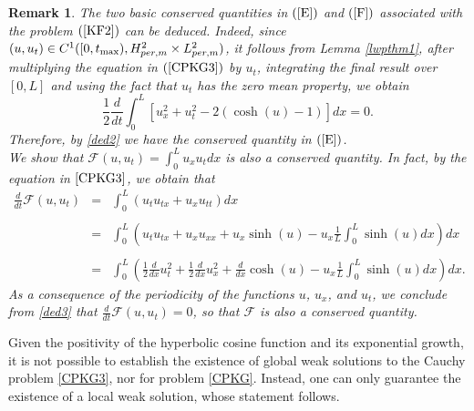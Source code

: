 \documentclass[12pt,reqno,a4paper]{amsart} %
\numberwithin{equation}{section}
\numberwithin{figure}{section}
\newtheorem{remark}[theorem]{Remark}
\begin{document}
\begin{remark}\label{cqEF} 
The two basic conserved quantities in $(\ref{E})$ and $(\ref{F})$ associated with the problem $(\ref{KF2})$ can be deduced. Indeed, since $(u, u_t)\in C^1([0,t_{\rm{max}}),H_{per,m}^2\times L_{per,m}^2)$, it follows from Lemma \ref{lwpthm1}, after multiplying the equation in $(\ref{CPKG3})$ by $u_t$, integrating the final result over $[0,L]$ and using the fact that $u_t$ has the zero mean property, we obtain
	\begin{equation}\label{ded2}
		\frac{1}{2}\frac{d}{dt}	 \int_{0}^{L} \left[u_x^2+u_t^2-2(\cosh(u)-1)\right] dx =0. 
	\end{equation}
	Therefore, by \eqref{ded2} we have the conserved quantity in $(\ref{E})$. \\
	\indent We show that $\mathcal{F}(u,u_t)=\displaystyle\int_{0}^{L}u_xu_t dx$ is also a conserved quantity. In fact, by the equation in $\eqref{CPKG3}$, we obtain that
	\begin{equation}\label{ded3}\begin{array}{llll}
			\displaystyle\frac{d}{dt}\mathcal{F}(u,u_t)&=& \displaystyle\int_{0}^{L}(u_tu_{tx}+ u_x u_{tt}) dx \\\\ &= &\displaystyle\int_{0}^{L}\left(u_t u_{tx}+ u_x u_{xx}+u_x\sinh(u)-u_x\frac{1}{L}\int_{0}^{L}\sinh(u)dx\right) dx \\\\ &= &\displaystyle\int_{0}^{L}\left(\frac{1}{2}\frac{d}{dx} u_t ^2
			+ \frac{1}{2}\frac{d}{dx} u_x ^2+\frac{d}{dx} \cosh(u)-u_x\frac{1}{L}\int_{0}^{L}\sinh(u)dx\right)dx.
	\end{array}\end{equation}
	As a consequence of the periodicity of the functions $u$, $u_x$, and $u_t$, we conclude from \eqref{ded3} that $\frac{d}{dt}\mathcal{F}(u,u_t)=0$, so that $\mathcal{F}$ is also a conserved quantity.
\end{remark}

Given the positivity of the hyperbolic cosine function and its exponential growth, it is not possible to establish the existence of global weak solutions to the Cauchy problem \eqref{CPKG3}, nor for problem \eqref{CPKG}. Instead, one can only guarantee the existence of a local weak solution, whose statement follows. 
\end{document}
